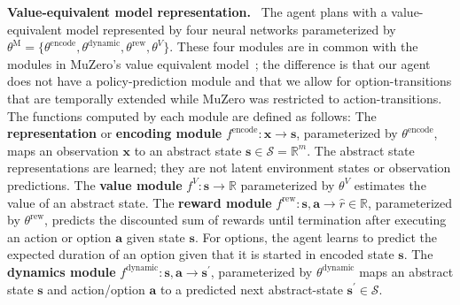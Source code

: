 \documentclass[nohyperref]{article}
\theoremstyle{plain}
\theoremstyle{definition}
\theoremstyle{remark}
\newcommand{\rick}[1]{{\color{ForestGreen}{\small\bf\sf [Rick: #1]}}}
\renewcommand{\paragraph}[1]{\textbf{#1}\ }
\newcommand{\obs}{\mathbf{x}}
\newcommand{\state}{\mathbf{s}}
\newcommand{\statespace}{\mathcal{S}}
\newcommand{\action}{\mathbf{a}}
\newcommand{\encode}{\mathrm{encode}}
\newcommand{\thetaencode}{\theta^{\encode}}
\newcommand{\fencode}{f^{\encode}}
\newcommand{\dynamic}{\mathrm{dynamic}}
\newcommand{\fdynamic}{f^{\dynamic}}
\newcommand{\thetadynamic}{\theta^{\dynamic}}
\newcommand{\reward}{\mathrm{rew}}
\newcommand{\freward}{f^{\reward}}
\newcommand{\thetareward}{\theta^{\reward}}
\newcommand{\val}{V}
\newcommand{\fvalue}{f^{\val}}
\newcommand{\thetavalue}{\theta^{\val}}
\newcommand{\thetamodel}{\theta^{\mathrm{M}}}
\begin{document}
\paragraph{Value-equivalent model representation.}
The agent plans with a value-equivalent model represented by four neural networks parameterized by $\thetamodel = \{ \thetaencode, \thetadynamic, \thetareward, \thetavalue  \}$.  These four modules are in common with the modules in MuZero's value equivalent model~\citep{schrittwieser2020mastering}; the difference is that our agent does not have a policy-prediction module and that we allow for option-transitions that are temporally extended while MuZero was restricted to action-transitions.
The functions computed by each module are defined as follows:
The \textbf{representation} or \textbf{encoding module} $\fencode: \obs \rightarrow \state$, parameterized by $\thetaencode$, maps an observation $\obs$ to an abstract state $\state \in \statespace = \mathbb{R}^{m}$. The abstract state representations are learned; they are not latent environment states or observation predictions. 
The \textbf{value module} $\fvalue: \state \rightarrow \mathbb{R}$ parameterized by $\thetavalue$ estimates the
value of an abstract state. %
The \textbf{reward module} $\freward: \state, \action \rightarrow \hat{r} \in \mathbb{R}$, parameterized by $\thetareward$, 
predicts the discounted sum of rewards until termination after executing an action or option $\action$ given state $\state$. For options, the agent learns to predict the expected duration of an option given that it is started in encoded state $\state$.
The \textbf{dynamics module} $\fdynamic: \state, \action \rightarrow \state^{\prime}$, parameterized by $\thetadynamic$ maps an abstract state $\state$ and action/option $\action$ to a predicted next abstract-state $\state^{\prime} \in \statespace$. %
\end{document}
